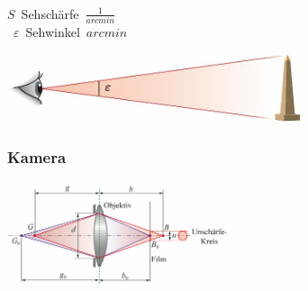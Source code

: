 \begin{center}
	\begin{minipage}{0.2\textwidth}
		 \\
		\unit{$S$}{Sehschärfe}{$\frac{1}{arcmin}$} \\
		\unit{$\varepsilon$}{Sehwinkel}{$arcmin$} \\
	\end{minipage}%
	\begin{minipage}{0.3\textwidth}
		\includegraphics[height=2cm,keepaspectratio=true]{Images/sehwinkel.png}
	\end{minipage}
\end{center}




\subsubsection{Kamera}

\begin{center}
	\begin{minipage}{0.26\textwidth}
	\end{minipage}%
	\begin{minipage}{0.3\textwidth}
		\includegraphics[height=3cm,keepaspectratio=true]{Images/kamera.png}
	\end{minipage}
\end{center}

